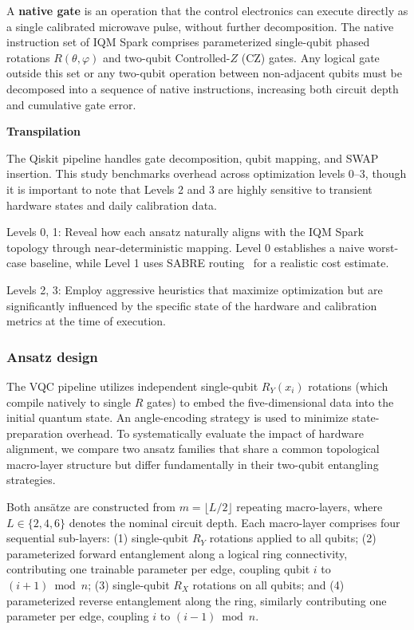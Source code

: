 \documentclass[11pt]{article}
\begin{document}
A \textbf{native gate} is an operation that the control electronics can execute directly as a single calibrated microwave pulse, without further decomposition. The native instruction set of IQM Spark comprises parameterized single-qubit phased rotations \(R(\theta, \varphi)\) and two-qubit Controlled-\(Z\) (CZ) gates. Any logical gate outside this set or any two-qubit operation between non-adjacent qubits must be decomposed into a sequence of native instructions, increasing both circuit depth and cumulative gate error. 

\textbf{Transpilation}

The Qiskit pipeline handles gate decomposition, qubit mapping, and SWAP insertion. This study benchmarks overhead across optimization levels 0–3, though it is important to note that Levels 2 and 3 are highly sensitive to transient hardware states and daily calibration data.

Levels 0, 1: Reveal how each ansatz naturally aligns with the IQM Spark topology through near-deterministic mapping. Level 0 establishes a naive worst-case baseline, while Level 1 uses SABRE routing~\cite{sabre2019} for a realistic cost estimate.

Levels 2, 3: Employ aggressive heuristics that maximize optimization but are significantly influenced by the specific state of the hardware and calibration metrics at the time of execution.

\subsubsection{Ansatz design}
The VQC pipeline utilizes independent single-qubit $R_Y(x_i)$ rotations (which compile natively to single $R$ gates) to embed the five-dimensional data into the initial quantum state. An angle-encoding strategy is used to minimize state-preparation overhead. To systematically evaluate the impact of hardware alignment, we compare two ansatz families that share a common topological macro-layer structure but differ fundamentally in their two-qubit entangling strategies.

Both ansätze are constructed from $m = \lfloor L/2 \rfloor$ repeating macro-layers, where $L \in \{2, 4, 6\}$ denotes the nominal circuit depth. Each macro-layer comprises four sequential sub-layers: 
(1) single-qubit $R_Y$ rotations applied to all qubits; 
(2) parameterized forward entanglement along a logical ring connectivity, contributing one trainable parameter per edge, coupling qubit $i$ to $(i+1) \bmod n$; 
(3) single-qubit $R_X$ rotations on all qubits; and 
(4) parameterized reverse entanglement along the ring, similarly contributing one parameter per edge, coupling $i$ to $(i-1) \bmod n$. 
\end{document}
